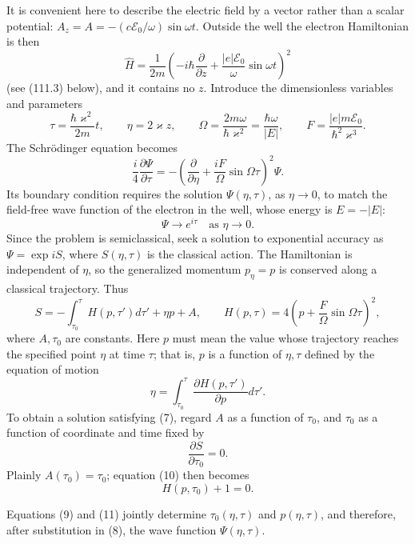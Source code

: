 It is convenient here to describe the electric field by a vector rather than a scalar potential: $A_z=A=-(c\mathcal E_0/\omega)\sin\omega t$. Outside the well the electron Hamiltonian is then
\[
 \widehat H=\frac1{2m}\left(-i\hbar\frac\partial{\partial z}+\frac{|e|\mathcal E_0}{\omega}\sin\omega t\right)^2
\]
(see (111.3) below), and it contains no $z$. Introduce the dimensionless variables and parameters
\[
 \tau=\frac{\hbar\varkappa^2}{2m}t,\qquad \eta=2\varkappa z,\qquad
 \Omega=\frac{2m\omega}{\hbar\varkappa^2}=\frac{\hbar\omega}{|E|},\qquad
 F=\frac{|e|m\mathcal E_0}{\hbar^2\varkappa^3}.
\]
The Schrödinger equation becomes
\[
 \frac i4\frac{\partial\Psi}{\partial\tau}=-\left(\frac\partial{\partial\eta}+\frac{iF}{\Omega}\sin\Omega\tau\right)^2\Psi.
\]
Its boundary condition requires the solution $\Psi(\eta,\tau)$, as $\eta\to0$, to match the field-free wave function of the electron in the well, whose energy is $E=-|E|$:
\begin{equation}
 \Psi\to e^{i\tau}\quad\text{as }\eta\to0.
 \tag{7}
\end{equation}
Since the problem is semiclassical, seek a solution to exponential accuracy as $\Psi=\exp iS$, where $S(\eta,\tau)$ is the classical action. The Hamiltonian is independent of $\eta$, so the generalized momentum $p_\eta=p$ is conserved along a classical trajectory. Thus
\begin{equation}
 S=-\int_{\tau_0}^{\tau}H(p,\tau')d\tau'+\eta p+A,\qquad
 H(p,\tau)=4\left(p+\frac F\Omega\sin\Omega\tau\right)^2,
 \tag{8}
\end{equation}
where $A,\tau_0$ are constants. Here $p$ must mean the value whose trajectory reaches the specified point $\eta$ at time $\tau$; that is, $p$ is a function of $\eta,\tau$ defined by the equation of motion
\begin{equation}
 \eta=\int_{\tau_0}^{\tau}\frac{\partial H(p,\tau')}{\partial p}d\tau'.
 \tag{9}
\end{equation}
To obtain a solution satisfying (7), regard $A$ as a function of $\tau_0$, and $\tau_0$ as a function of coordinate and time fixed by
\begin{equation}
 \frac{\partial S}{\partial\tau_0}=0.
 \tag{10}
\end{equation}
Plainly $A(\tau_0)=\tau_0$; equation (10) then becomes
\begin{equation}
 H(p,\tau_0)+1=0.
 \tag{11}
\end{equation}

Equations (9) and (11) jointly determine $\tau_0(\eta,\tau)$ and $p(\eta,\tau)$, and therefore, after substitution in (8), the wave function $\Psi(\eta,\tau)$.

